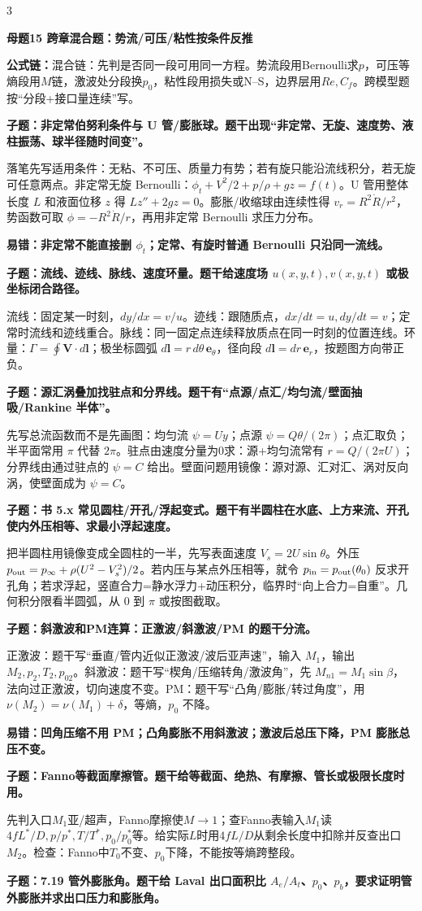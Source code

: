\documentclass[a4paper]{article}
\newcommand{\mt}[1]{\vspace{0.12pt}\colorbox{M}{\parbox{\dimexpr\linewidth-2\fboxsep}{\color{white}\bfseries #1}}\par}
\newcommand{\qt}[1]{\vspace{0.04pt}\colorbox{Q}{\parbox{\dimexpr\linewidth-2\fboxsep}{\color{white}\bfseries #1}}\par}
\newcommand{\ans}[1]{\colorbox{G}{\parbox{\dimexpr\linewidth-2\fboxsep}{#1}}\par}
\newcommand{\warn}[1]{\colorbox{Y}{\parbox{\dimexpr\linewidth-2\fboxsep}{\color{E}\bfseries #1}}\par}
\newcommand{\form}[1]{{\color{M}\bfseries 公式链：}#1\par}
\begin{document}
\begin{multicols}{3}
\mt{母题15 跨章混合题：势流/可压/粘性按条件反推}
\form{混合链：先判是否同一段可用同一方程。势流段用Bernoulli求$p$，可压等熵段用$M$链，激波处分段换$p_0$，粘性段用损失或N--S，边界层用$Re,C_f$。跨模型题按“分段+接口量连续”写。}
\qt{子题：非定常伯努利条件与 U 管/膨胀球。题干出现“非定常、无旋、速度势、液柱振荡、球半径随时间变”。}
\ans{落笔先写适用条件：无粘、不可压、质量力有势；若有旋只能沿流线积分，若无旋可任意两点。非定常无旋 Bernoulli：$\phi_t+V^2/2+p/\rho+gz=f(t)$。U 管用整体长度 $L$ 和液面位移 $z$ 得 $Lz''+2gz=0$。膨胀/收缩球由连续性得 $v_r=R^2\dot R/r^2$，势函数可取 $\phi=-R^2\dot R/r$，再用非定常 Bernoulli 求压力分布。}
\warn{易错：非定常不能直接删 $\phi_t$；定常、有旋时普通 Bernoulli 只沿同一流线。}
\qt{子题：流线、迹线、脉线、速度环量。题干给速度场 $u(x,y,t),v(x,y,t)$ 或极坐标闭合路径。}
\ans{流线：固定某一时刻，$dy/dx=v/u$。迹线：跟随质点，$dx/dt=u,dy/dt=v$；定常时流线和迹线重合。脉线：同一固定点连续释放质点在同一时刻的位置连线。环量：$\Gamma=\oint\bm V\cdot d\bm l$；极坐标圆弧 $d\bm l=r\,d\theta\,\bm e_\theta$，径向段 $d\bm l=dr\,\bm e_r$，按题图方向带正负。}
\qt{子题：源汇涡叠加找驻点和分界线。题干有“点源/点汇/均匀流/壁面抽吸/Rankine 半体”。}
\ans{先写总流函数而不是先画图：均匀流 $\psi=Uy$；点源 $\psi=Q\theta/(2\pi)$；点汇取负；半平面常用 $\pi$ 代替 $2\pi$。驻点由速度分量为0求：源+均匀流常有 $r=Q/(2\pi U)$；分界线由通过驻点的 $\psi=C$ 给出。壁面问题用镜像：源对源、汇对汇、涡对反向涡，使壁面成为 $\psi=C$。}
\qt{子题：书 5.x 常见圆柱/开孔/浮起变式。题干有半圆柱在水底、上方来流、开孔使内外压相等、求最小浮起速度。}
\ans{把半圆柱用镜像变成全圆柱的一半，先写表面速度 $V_s=2U\sin\theta$。外压 $p_{\rm out}=p_\infty+\rho(U^2-V_s^2)/2$。若内压与某点外压相等，就令 $p_{\rm in}=p_{\rm out}(\theta_0)$ 反求开孔角；若求浮起，竖直合力=静水浮力+动压积分，临界时“向上合力=自重”。几何积分限看半圆弧，从 $0$ 到 $\pi$ 或按图截取。}
\qt{子题：斜激波和PM连算：正激波/斜激波/PM 的题干分流。}
\ans{正激波：题干写“垂直/管内近似正激波/波后亚声速”，输入 $M_1$，输出 $M_2,p_2,T_2,p_{02}$。斜激波：题干写“楔角/压缩转角/激波角”，先 $M_{n1}=M_1\sin\beta$，法向过正激波，切向速度不变。PM：题干写“凸角/膨胀/转过角度”，用 $\nu(M_2)=\nu(M_1)+\delta$，等熵，$p_0$ 不降。}
\warn{易错：凹角压缩不用 PM；凸角膨胀不用斜激波；激波后总压下降，PM 膨胀总压不变。}
\qt{子题：Fanno等截面摩擦管。题干给等截面、绝热、有摩擦、管长或极限长度时用。}
\ans{先判入口$M_1$亚/超声，Fanno摩擦使$M\to1$；查Fanno表输入$M_1$读$4fL^*/D,p/p^*,T/T^*,p_0/p_0^*$等。给实际$L$时用$4fL/D$从剩余长度中扣除并反查出口$M_2$。检查：Fanno中$T_0$不变、$p_0$下降，不能按等熵跨整段。}
\qt{子题：7.19 管外膨胀角。题干给 Laval 出口面积比 $A_e/A_t$、$p_0$、$p_b$，要求证明管外膨胀并求出口压力和膨胀角。}

\end{multicols}
\end{document}
